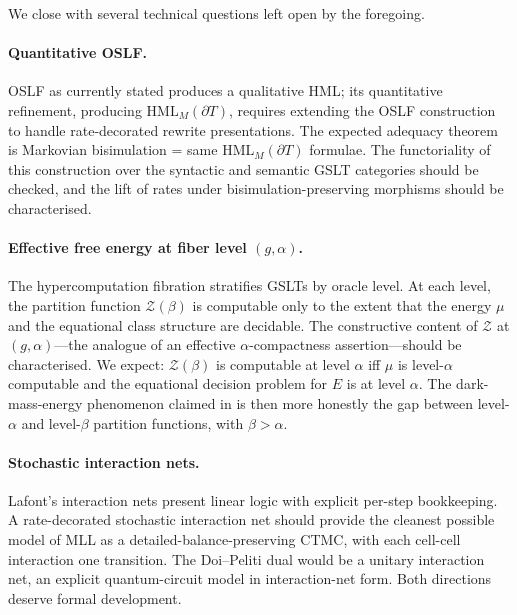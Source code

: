 \documentclass[11pt]{article}
\theoremstyle{plain}
\theoremstyle{definition}
\theoremstyle{remark}
\newcommand{\Z}{\mathcal{Z}}
\newcommand{\HML}{\mathrm{HML}}
\newcommand{\bd}{\partial}
\begin{document}
We close with several technical questions left open by the foregoing.

\paragraph{Quantitative OSLF.} OSLF as currently stated produces a qualitative HML; its quantitative refinement, producing $\HML_M(\bd T)$, requires extending the OSLF construction to handle rate-decorated rewrite presentations. The expected adequacy theorem is Markovian bisimulation = same $\HML_M(\bd T)$ formulae. The functoriality of this construction over the syntactic and semantic GSLT categories should be checked, and the lift of rates under bisimulation-preserving morphisms should be characterised.

\paragraph{Effective free energy at fiber level $(g, \alpha)$.} The hypercomputation fibration \cite{gslt-context} stratifies GSLTs by oracle level. At each level, the partition function $\Z(\beta)$ is computable only to the extent that the energy $\mu$ and the equational class structure are decidable. The constructive content of $\Z$ at $(g, \alpha)$---the analogue of an effective $\alpha$-compactness assertion---should be characterised. We expect: $\Z(\beta)$ is computable at level $\alpha$ iff $\mu$ is level-$\alpha$ computable and the equational decision problem for $E$ is at level $\alpha$. The dark-mass-energy phenomenon claimed in \cite{energetics-context} is then more honestly the gap between level-$\alpha$ and level-$\beta$ partition functions, with $\beta > \alpha$.

\paragraph{Stochastic interaction nets.} Lafont's interaction nets \cite{Lafont90} present linear logic with explicit per-step bookkeeping. A rate-decorated stochastic interaction net should provide the cleanest possible model of MLL as a detailed-balance-preserving CTMC, with each cell-cell interaction one transition. The Doi--Peliti dual would be a unitary interaction net, an explicit quantum-circuit model in interaction-net form. Both directions deserve formal development.
\end{document}
